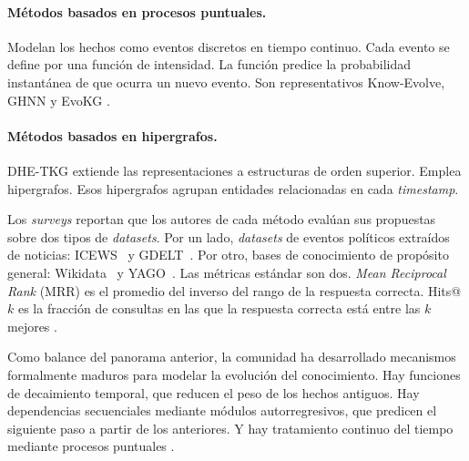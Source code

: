 \paragraph{Métodos basados en procesos puntuales.} Modelan los hechos como eventos discretos en tiempo continuo. Cada evento se define por una función de intensidad. La función predice la probabilidad instantánea de que ocurra un nuevo evento. Son representativos Know-Evolve, GHNN y EvoKG \cite{tkg_survey2024}.

\paragraph{Métodos basados en hipergrafos.} DHE-TKG \cite{dhe_tkg2024} extiende las representaciones a estructuras de orden superior. Emplea hipergrafos. Esos hipergrafos agrupan entidades relacionadas en cada \emph{timestamp}.

Los \emph{surveys} \cite{tkg_survey2024, tkgc_survey2023} reportan que los autores de cada método evalúan sus propuestas sobre dos tipos de \emph{datasets}. Por un lado, \emph{datasets} de eventos políticos extraídos de noticias: ICEWS~\cite{icews_placeholder} y GDELT~\cite{gdelt_placeholder}. Por otro, bases de conocimiento de propósito general: Wikidata~\cite{wikidata_placeholder} y YAGO~\cite{yago_placeholder}. Las métricas estándar son dos. \emph{Mean Reciprocal Rank} (MRR) \cite{mrr_placeholder} es el promedio del inverso del rango de la respuesta correcta. Hits@$k$ \cite{hitsk_placeholder} es la fracción de consultas en las que la respuesta correcta está entre las $k$ mejores \cite{tkg_survey2024, tkgc_survey2023}.

Como balance del panorama anterior, la comunidad ha desarrollado mecanismos formalmente maduros para modelar la evolución del conocimiento. Hay funciones de decaimiento temporal, que reducen el peso de los hechos antiguos. Hay dependencias secuenciales mediante módulos autorregresivos, que predicen el siguiente paso a partir de los anteriores. Y hay tratamiento continuo del tiempo mediante procesos puntuales \cite{tkg_survey2024, tkgc_survey2023}.

